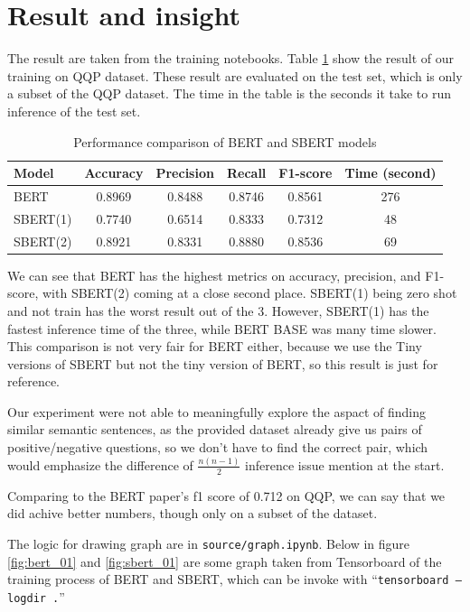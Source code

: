 \section{Result and insight}

The result are taken from the training notebooks. Table \ref{tab:models} show the result of our training on QQP dataset. These result are evaluated on the test set, which is only a subset of the QQP dataset. The time in the table is the seconds it take to run inference of the test set.

\begin{table}[ht]
\centering
\begin{tabular}{lccccc}
    \hline
    Model & Accuracy & Precision & Recall & F1-score & Time (second) \\
    \hline
    BERT     & 0.8969 & 0.8488 & 0.8746 & 0.8561 & 276 \\
    SBERT(1) & 0.7740 & 0.6514 & 0.8333 & 0.7312 & 48  \\
    SBERT(2) & 0.8921 & 0.8331 & 0.8880 & 0.8536 & 69  \\
    \hline
\end{tabular}
\caption{Performance comparison of BERT and SBERT models}
\label{tab:models}
\end{table}

 We can see that BERT has the highest metrics on accuracy, precision, and F1-score, with SBERT(2) coming at a close second place. SBERT(1) being zero shot and not train has the worst result out of the 3. However, SBERT(1) has the fastest inference time of the three, while BERT BASE was many time slower. This comparison is not very fair for BERT either, because we use the Tiny versions of SBERT but not the tiny version of BERT, so this result is just for reference.

Our experiment were not able to meaningfully explore the aspact of finding similar semantic sentences, as the provided dataset already give us pairs of positive/negative questions, so we don't have to find the correct pair, which would emphasize the difference of $\frac{n(n-1)}{2}$ inference issue mention at the start. 

Comparing to the BERT paper's f1 score of 0.712 on QQP, we can say that we did achive better numbers, though only on a subset of the dataset.



The logic for drawing graph are in \texttt{source/graph.ipynb}. Below in figure \ref{fig:bert_01} and \ref{fig:sbert_01} are some graph taken from Tensorboard of the training process of BERT and SBERT, which can be invoke with ``\texttt{tensorboard --logdir .}''

